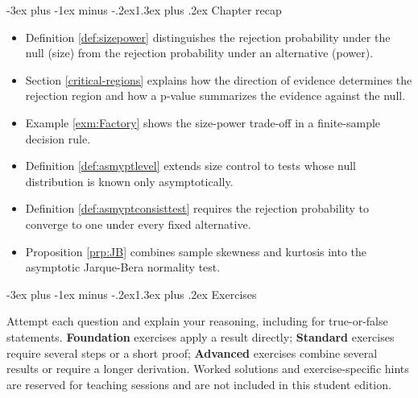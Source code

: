 \documentclass[
  11pt,
]{book}
\makeatletter
\providecommand{\tightlist}{%
  \setlength{\itemsep}{0pt}\setlength{\parskip}{0pt}}
\renewcommand\section{\@startsection{section}{1}{\z@}
  {-3ex plus -1ex minus -.2ex}{1.3ex plus .2ex}
  {\normalfont\Large\bfseries\color{TextbookInk}}}
\theoremstyle{definition}
\theoremstyle{definition}
\theoremstyle{definition}
\theoremstyle{definition}
\theoremstyle{remark}
\makeatother
\begin{document}

\section{Chapter recap}\label{tests-recap}

\begin{recapbox}

\begin{itemize}
\tightlist
\item
  Definition \ref{def:sizepower} distinguishes the rejection probability under the null (size) from the rejection probability under an alternative (power).
\item
  Section \ref{critical-regions} explains how the direction of evidence determines the rejection region and how a p-value summarizes the evidence against the null.
\item
  Example \ref{exm:Factory} shows the size-power trade-off in a finite-sample decision rule.
\item
  Definition \ref{def:asmyptlevel} extends size control to tests whose null distribution is known only asymptotically.
\item
  Definition \ref{def:asmyptconsisttest} requires the rejection probability to converge to one under every fixed alternative.
\item
  Proposition \ref{prp:JB} combines sample skewness and kurtosis into the asymptotic Jarque-Bera normality test.
\end{itemize}

\end{recapbox}

\clearpage

\section{Exercises}\label{tests-exercises}

Attempt each question and explain your reasoning, including for true-or-false statements. \textbf{Foundation} exercises apply a result directly; \textbf{Standard} exercises require several steps or a short proof; \textbf{Advanced} exercises combine several results or require a longer derivation. Worked solutions and exercise-specific hints are reserved for teaching sessions and are not included in this student edition.

\end{document}
